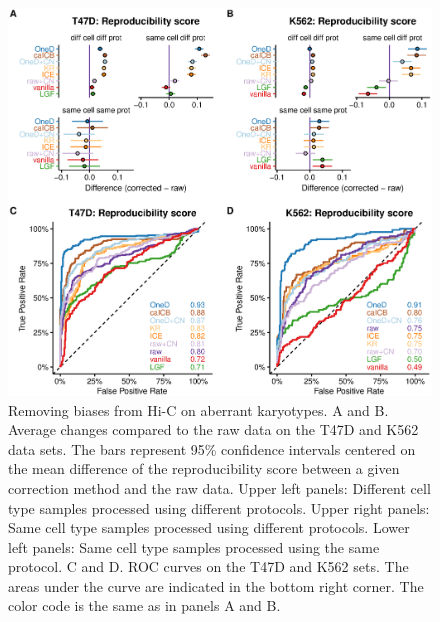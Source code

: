 \documentclass[a4,center,fleqn]{NAR}
\providecommand{\DIFadd}[1]{{\protect\color{red}#1}} %
\providecommand{\DIFdel}[1]{{\protect}}                      %
\providecommand{\DIFaddbegin}{} %
\providecommand{\DIFdelbegin}{} %
\providecommand{\DIFdelend}{} %
\providecommand{\DIFaddFL}[1]{\DIFadd{#1}} %
\begin{document}
\DIFdelbegin \DIFdel{The }\textit{\DIFdel{caICB}} %
\DIFdel{and }\textit{\DIFdel{ICE}} %
\DIFdel{methods increased the similarity
between the different cell
lines }\DIFdelend \DIFaddbegin \begin{figure}
\centerline{\includegraphics[width=.49\textwidth]{figure_2.eps}}
\caption{\DIFaddFL{Removing biases from Hi-C on aberrant karyotypes. A and B.
Average changes compared to the raw data on the T47D and K562 data sets.
The bars represent 95\% confidence intervals centered on the mean
difference of the reproducibility score between a given correction method
and the raw data. Upper left panels: Different cell type samples
processed using different protocols. Upper right panels: Same cell
type samples processed using different protocols. Lower left panels:
Same cell type samples processed using the same protocol. C and D. ROC
curves on the T47D and K562 sets. The areas under the curve are
indicated in the bottom right corner. The color code is the same as in
panels A and B.}}
\label{fig:aberrant}
\end{figure}
\end{document}
